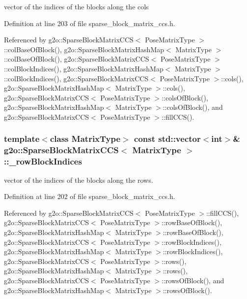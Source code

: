 vector of the indices of the blocks along the cols 



Definition at line 203 of file sparse\+\_\+block\+\_\+matrix\+\_\+ccs.\+h.



Referenced by g2o\+::\+Sparse\+Block\+Matrix\+C\+C\+S$<$ Pose\+Matrix\+Type $>$\+::col\+Base\+Of\+Block(), g2o\+::\+Sparse\+Block\+Matrix\+Hash\+Map$<$ Matrix\+Type $>$\+::col\+Base\+Of\+Block(), g2o\+::\+Sparse\+Block\+Matrix\+C\+C\+S$<$ Pose\+Matrix\+Type $>$\+::col\+Block\+Indices(), g2o\+::\+Sparse\+Block\+Matrix\+Hash\+Map$<$ Matrix\+Type $>$\+::col\+Block\+Indices(), g2o\+::\+Sparse\+Block\+Matrix\+C\+C\+S$<$ Pose\+Matrix\+Type $>$\+::cols(), g2o\+::\+Sparse\+Block\+Matrix\+Hash\+Map$<$ Matrix\+Type $>$\+::cols(), g2o\+::\+Sparse\+Block\+Matrix\+C\+C\+S$<$ Pose\+Matrix\+Type $>$\+::cols\+Of\+Block(), g2o\+::\+Sparse\+Block\+Matrix\+Hash\+Map$<$ Matrix\+Type $>$\+::cols\+Of\+Block(), and g2o\+::\+Sparse\+Block\+Matrix\+C\+C\+S$<$ Pose\+Matrix\+Type $>$\+::fill\+C\+C\+S().

\subsubsection[{\texorpdfstring{\+\_\+row\+Block\+Indices}{_rowBlockIndices}}]{\setlength{\rightskip}{0pt plus 5cm}template$<$class Matrix\+Type$>$ const std\+::vector$<$int$>$\& {\bf g2o\+::\+Sparse\+Block\+Matrix\+C\+CS}$<$ Matrix\+Type $>$\+::\+\_\+row\+Block\+Indices\hspace{0.3cm}{\ttfamily [protected]}}\hypertarget{classg2o_1_1SparseBlockMatrixCCS_afabda9a2efe5ea9efb5a1e5312f6e307}{}\label{classg2o_1_1SparseBlockMatrixCCS_afabda9a2efe5ea9efb5a1e5312f6e307}


vector of the indices of the blocks along the rows. 



Definition at line 202 of file sparse\+\_\+block\+\_\+matrix\+\_\+ccs.\+h.



Referenced by g2o\+::\+Sparse\+Block\+Matrix\+C\+C\+S$<$ Pose\+Matrix\+Type $>$\+::fill\+C\+C\+S(), g2o\+::\+Sparse\+Block\+Matrix\+C\+C\+S$<$ Pose\+Matrix\+Type $>$\+::row\+Base\+Of\+Block(), g2o\+::\+Sparse\+Block\+Matrix\+Hash\+Map$<$ Matrix\+Type $>$\+::row\+Base\+Of\+Block(), g2o\+::\+Sparse\+Block\+Matrix\+C\+C\+S$<$ Pose\+Matrix\+Type $>$\+::row\+Block\+Indices(), g2o\+::\+Sparse\+Block\+Matrix\+Hash\+Map$<$ Matrix\+Type $>$\+::row\+Block\+Indices(), g2o\+::\+Sparse\+Block\+Matrix\+C\+C\+S$<$ Pose\+Matrix\+Type $>$\+::rows(), g2o\+::\+Sparse\+Block\+Matrix\+Hash\+Map$<$ Matrix\+Type $>$\+::rows(), g2o\+::\+Sparse\+Block\+Matrix\+C\+C\+S$<$ Pose\+Matrix\+Type $>$\+::rows\+Of\+Block(), and g2o\+::\+Sparse\+Block\+Matrix\+Hash\+Map$<$ Matrix\+Type $>$\+::rows\+Of\+Block().



